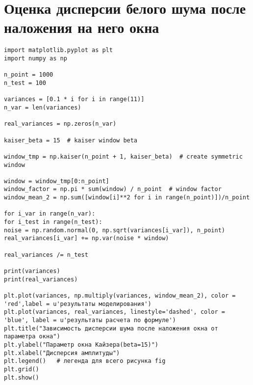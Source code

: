 \chapter{Оценка дисперсии белого шума после наложения на него окна}\label{app:Г}
\begin{verbatim}
import matplotlib.pyplot as plt
import numpy as np

n_point = 1000
n_test = 100

variances = [0.1 * i for i in range(11)]
n_var = len(variances)

real_variances = np.zeros(n_var)

kaiser_beta = 15  # kaiser window beta

window_tmp = np.kaiser(n_point + 1, kaiser_beta)  # create symmetric window

window = window_tmp[0:n_point]
window_factor = np.pi * sum(window) / n_point  # window factor
window_mean_2 = np.sum([window[i]**2 for i in range(n_point)])/n_point

for i_var in range(n_var):
for i_test in range(n_test):
noise = np.random.normal(0, np.sqrt(variances[i_var]), n_point)
real_variances[i_var] += np.var(noise * window)

real_variances /= n_test

print(variances)
print(real_variances)

plt.plot(variances, np.multiply(variances, window_mean_2), color = 'red',label = u'результаты моделирования')
plt.plot(variances, real_variances, linestyle='dashed', color = 'blue', label = u'результаты расчета по формуле')
plt.title("Зависимость дисперсии шума после наложения окна от параметра окна")
plt.ylabel("Параметр окна Кайзера(beta=15)")
plt.xlabel("Дисперсия амплитуды")
plt.legend()   # легенда для всего рисунка fig
plt.grid()
plt.show()
\end{verbatim}

